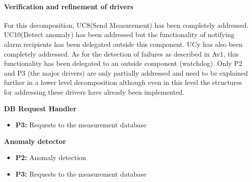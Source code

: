 \paragraph{Verification and refinement of drivers}
For this decomposition, UC8(Send Measurement) has been completely addressed. 
UC10(Detect anomaly) has been addressed but the functionality of notifying alarm recipients has been delegated outside this component.
UCy has also been completely addressed. As for the detection of failures as described in Av1, this functionality has been delegated to an outside component (watchdog).
Only P2 and P3 (the major drivers) are only partially addressed and need to be explained further in a lower level decomposition although even in this level the structures for addressing these drivers have already been implemented.

\textbf{DB Request Handler}
\begin{itemize}
	\item \textbf{P3: } Requests to the measurement database
\end{itemize} 

\textbf{Anomaly detector}
\begin{itemize}
	\item \textbf{P2: } Anomaly detection
	\item \textbf{P3: } Requests to the measurement database
\end{itemize} 
